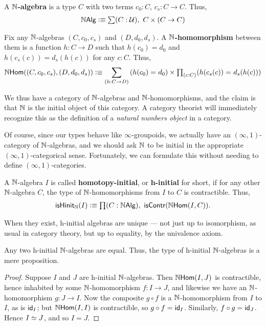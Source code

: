 \begin{defn}
A \textbf{$\nat$-algebra} is a type $C$ with two terms $c_0 : C$, $c_s : C \to C$. Thus,
\begin{align*}
\nalg \defeq \sm {C : \type} C \times (C \to C)
\end{align*}
\end{defn}

\begin{defn}
Fix any $\nat$-algebras $(C,c_0,c_s)$ and $(D,d_0,d_s)$. A \textbf{$\nat$-homomorphism} between them is a function $h : C \to D$ such that $h(c_0) = d_0$ and $h(c_s(c)) = d_s(h(c))$ for any $c : C$. Thus,
\begin{equation*}
\nhom((C,c_0,c_s),(D,d_0,d_s)) \defeq
 \dsm {h : C \to D} (\id{h(c_0)}{d_0}) \times \tprd{c:C} (\id{h(c_s(c))}{d_s(h(c))})
\end{equation*}
\end{defn}

We thus have a category of $\nat$-algebras and $\nat$-homomorphisms, and the claim is that $\nat$ is the initial object of this category.
A category theorist will immediately recognize this as the definition of a \emph{natural numbers object} in a category.

Of course, since our types behave like $\infty$-groupoids, we actually have an $(\infty,1)$-category of $\nat$-algebras, and we should ask $\nat$ to be initial in the appropriate $(\infty,1)$-categorical sense.
Fortunately, we can formulate this without needing to define $(\infty,1)$-categories.

\begin{defn}
A $\nat$-algebra $I$ is called \textbf{homotopy-initial}, or \textbf{h-initial} for short, if for any other $\nat$-algebra $C$, the type of $\nat$-homomorphisms from $I$ to $C$ is contractible. Thus,
\begin{align*}
\ishinitn (I) \defeq \prd{C : \nalg} \iscontr(\nhom(I,C)).
\end{align*}
\end{defn}

When they exist, h-initial algebras are unique --- not just up to isomorphism, as usual in category theory, but up to equality, by the univalence axiom.

\begin{thm}
  Any two h-initial $\nat$-algebras are equal.
  Thus, the type of h-initial $\nat$-algebras is a mere proposition.
\end{thm}
\begin{proof}
  Suppose $I$ and $J$ are h-initial $\nat$-algebras.
  Then $\nhom(I,J)$ is contractible, hence inhabited by some $\nat$-homomorphism $f:I\to J$, and likewise we have an $\nat$-homomorphism $g:J\to I$.
  Now the composite $g\circ f$ is a $\nat$-homomorphism from $I$ to $I$, as is $\idfunc[I]$; but $\nhom(I,I)$ is contractible, so $g\circ f = \idfunc[I]$.
  Similarly, $f\circ g = \idfunc[J]$.
  Hence $\eqv IJ$, and so $I=J$.
\end{proof}

